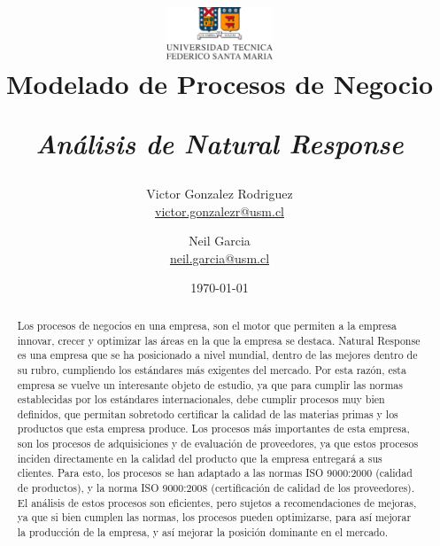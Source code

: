 \documentclass[12pt,letterpaper]{article}
\begin{document}
\begin{titlepage} 

\title{\includegraphics[width=120px]{./UTFSM.png}\\[0.5cm] Modelado de Procesos de Negocio \\ \begin{Large}\it Análisis de Natural Response\end{Large}} 
\author{Victor Gonzalez Rodriguez\\\url{victor.gonzalezr@usm.cl} \\
\and Neil Garcia\\\url{neil.garcia@usm.cl}}
\date{\today}
\maketitle
\begin{abstract}
Los procesos de negocios en una empresa, son el motor que permiten a la empresa innovar, crecer y optimizar las áreas en la que la empresa se destaca. Natural Response es una empresa que se ha posicionado a nivel mundial, dentro de las mejores dentro de su rubro, cumpliendo los estándares más exigentes del mercado. Por esta razón, esta empresa se vuelve un interesante objeto de estudio, ya que para cumplir las normas establecidas por los estándares internacionales, debe cumplir procesos muy bien definidos, que permitan sobretodo certificar la calidad de las materias primas y los productos que esta empresa produce. Los procesos más importantes de esta empresa, son los procesos de adquisiciones y de evaluación de proveedores, ya que estos procesos inciden directamente en la calidad del producto que la empresa entregará a sus clientes. Para esto, los procesos se han adaptado a las normas ISO 9000:2000 (calidad de productos), y la norma ISO 9000:2008 (certificación de calidad de los proveedores). El análisis de estos procesos son eficientes, pero sujetos a recomendaciones de mejoras, ya que si bien cumplen las normas, los procesos pueden optimizarse, para así mejorar la producción de la empresa, y así mejorar la posición dominante en el mercado.
\end{abstract}
\end{titlepage}
\newpage
\tableofcontents
\newpage
\end{document}
